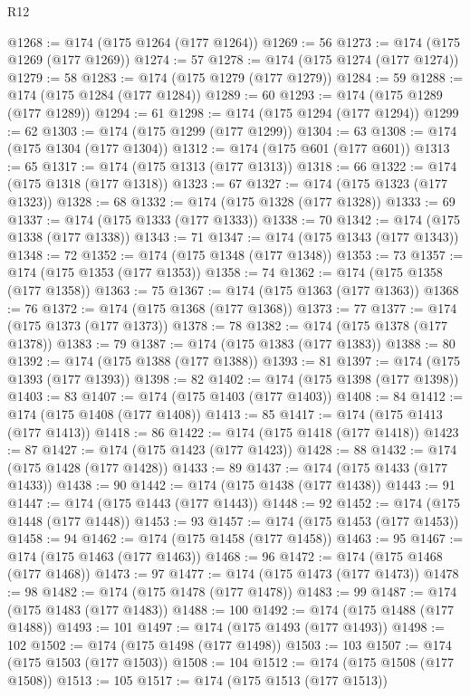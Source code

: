 \begin{lexlean}{R12}
\begin{coremodule}
{{{{{{{{{{{{{{{{{{{{{{{{{{{{{{{{{{{{{{{{{{{{{{{{{{{{{{{{{{{{{{{{{{{{{{{{{{{{{{{{{{{{{{{{{{{{{{{{{{{{{{{{{{@1268 := @174 (@175 @1264 (@177 @1264))
@1269 := 56
@1273 := @174 (@175 @1269 (@177 @1269))
@1274 := 57
@1278 := @174 (@175 @1274 (@177 @1274))
@1279 := 58
@1283 := @174 (@175 @1279 (@177 @1279))
@1284 := 59
@1288 := @174 (@175 @1284 (@177 @1284))
@1289 := 60
@1293 := @174 (@175 @1289 (@177 @1289))
@1294 := 61
@1298 := @174 (@175 @1294 (@177 @1294))
@1299 := 62
@1303 := @174 (@175 @1299 (@177 @1299))
@1304 := 63
@1308 := @174 (@175 @1304 (@177 @1304))
@1312 := @174 (@175 @601 (@177 @601))
@1313 := 65
@1317 := @174 (@175 @1313 (@177 @1313))
@1318 := 66
@1322 := @174 (@175 @1318 (@177 @1318))
@1323 := 67
@1327 := @174 (@175 @1323 (@177 @1323))
@1328 := 68
@1332 := @174 (@175 @1328 (@177 @1328))
@1333 := 69
@1337 := @174 (@175 @1333 (@177 @1333))
@1338 := 70
@1342 := @174 (@175 @1338 (@177 @1338))
@1343 := 71
@1347 := @174 (@175 @1343 (@177 @1343))
@1348 := 72
@1352 := @174 (@175 @1348 (@177 @1348))
@1353 := 73
@1357 := @174 (@175 @1353 (@177 @1353))
@1358 := 74
@1362 := @174 (@175 @1358 (@177 @1358))
@1363 := 75
@1367 := @174 (@175 @1363 (@177 @1363))
@1368 := 76
@1372 := @174 (@175 @1368 (@177 @1368))
@1373 := 77
@1377 := @174 (@175 @1373 (@177 @1373))
@1378 := 78
@1382 := @174 (@175 @1378 (@177 @1378))
@1383 := 79
@1387 := @174 (@175 @1383 (@177 @1383))
@1388 := 80
@1392 := @174 (@175 @1388 (@177 @1388))
@1393 := 81
@1397 := @174 (@175 @1393 (@177 @1393))
@1398 := 82
@1402 := @174 (@175 @1398 (@177 @1398))
@1403 := 83
@1407 := @174 (@175 @1403 (@177 @1403))
@1408 := 84
@1412 := @174 (@175 @1408 (@177 @1408))
@1413 := 85
@1417 := @174 (@175 @1413 (@177 @1413))
@1418 := 86
@1422 := @174 (@175 @1418 (@177 @1418))
@1423 := 87
@1427 := @174 (@175 @1423 (@177 @1423))
@1428 := 88
@1432 := @174 (@175 @1428 (@177 @1428))
@1433 := 89
@1437 := @174 (@175 @1433 (@177 @1433))
@1438 := 90
@1442 := @174 (@175 @1438 (@177 @1438))
@1443 := 91
@1447 := @174 (@175 @1443 (@177 @1443))
@1448 := 92
@1452 := @174 (@175 @1448 (@177 @1448))
@1453 := 93
@1457 := @174 (@175 @1453 (@177 @1453))
@1458 := 94
@1462 := @174 (@175 @1458 (@177 @1458))
@1463 := 95
@1467 := @174 (@175 @1463 (@177 @1463))
@1468 := 96
@1472 := @174 (@175 @1468 (@177 @1468))
@1473 := 97
@1477 := @174 (@175 @1473 (@177 @1473))
@1478 := 98
@1482 := @174 (@175 @1478 (@177 @1478))
@1483 := 99
@1487 := @174 (@175 @1483 (@177 @1483))
@1488 := 100
@1492 := @174 (@175 @1488 (@177 @1488))
@1493 := 101
@1497 := @174 (@175 @1493 (@177 @1493))
@1498 := 102
@1502 := @174 (@175 @1498 (@177 @1498))
@1503 := 103
@1507 := @174 (@175 @1503 (@177 @1503))
@1508 := 104
@1512 := @174 (@175 @1508 (@177 @1508))
@1513 := 105
@1517 := @174 (@175 @1513 (@177 @1513))
}}}}}}}}}}}}}}}}}}}}}}}}}}}}}}}}}}}}}}}}}}}}}}}}}}}}}}}}}}}}}}}}}}}}}}}}}}}}}}}}}}}}}}}}}}}}}}}}}}}}}}}}}}
\end{coremodule}
\end{lexlean}
